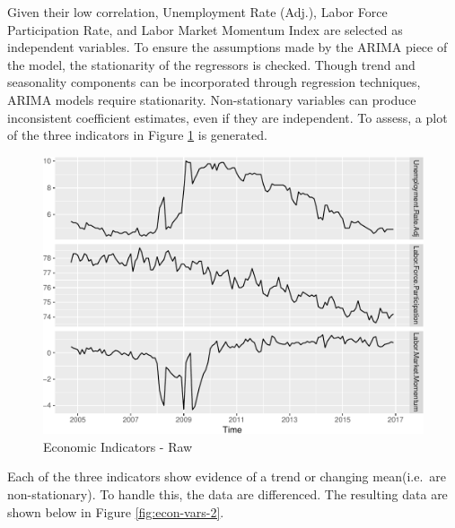 \documentclass[12pt,letterpaper,toc=flat,oneside]{report}
\theoremstyle{definition}
\theoremstyle{definition}
\theoremstyle{definition}
\theoremstyle{remark}
\begin{document}
Given their low correlation, Unemployment Rate (Adj.), Labor Force
Participation Rate, and Labor Market Momentum Index are selected as
independent variables. To ensure the assumptions made by the ARIMA piece
of the model, the stationarity of the regressors is checked. Though
trend and seasonality components can be incorporated through regression
techniques, ARIMA models require stationarity. Non-stationary variables
can produce inconsistent coefficient estimates, even if they are
independent. To assess, a plot of the three indicators in Figure
\ref{fig:econ-vars-1} is generated.

\begin{figure}[H]

{\centering \includegraphics{elliott-econometric-personnel-retention-18_files/figure-latex/econ-vars-1-1} 

}

\caption{Economic Indicators - Raw}\label{fig:econ-vars-1}
\end{figure}

Each of the three indicators show evidence of a trend or changing
mean(i.e.~are non-stationary). To handle this, the data are differenced.
The resulting data are shown below in Figure \ref{fig:econ-vars-2}.
\end{document}

